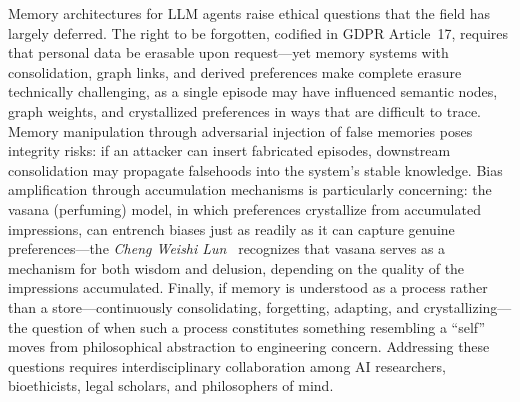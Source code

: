 Memory architectures for LLM agents raise ethical questions that the
field has largely deferred. The right to be forgotten, codified in
GDPR Article~17, requires that personal data be erasable upon
request---yet memory systems with consolidation, graph links, and
derived preferences make complete erasure technically challenging, as
a single episode may have influenced semantic nodes, graph weights,
and crystallized preferences in ways that are difficult to trace.
Memory manipulation through adversarial injection of false memories
poses integrity risks: if an attacker can insert fabricated episodes,
downstream consolidation may propagate falsehoods into the system's
stable knowledge. Bias amplification through accumulation mechanisms
is particularly concerning: the vasana (perfuming) model, in which
preferences crystallize from accumulated impressions, can entrench
biases just as readily as it can capture genuine preferences---the
\emph{Cheng Weishi Lun}~\cite{chengweishilun} recognizes that
vasana serves as a mechanism for both wisdom and delusion, depending
on the quality of the impressions accumulated. Finally, if memory is
understood as a process rather than a store---continuously
consolidating, forgetting, adapting, and crystallizing---the question
of when such a process constitutes something resembling a ``self''
moves from philosophical abstraction to engineering concern.
Addressing these questions requires interdisciplinary collaboration
among AI researchers, bioethicists, legal scholars, and philosophers
of mind.
